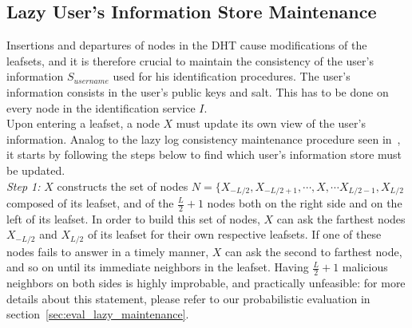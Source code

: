 
\subsection{Lazy User's Information Store Maintenance}
\label{sec:lazy_node_maintenance}
Insertions and departures of nodes in the DHT cause modifications of the
leafsets, and it is therefore crucial to maintain the consistency of the user's
information $S_{username}$ used for his identification procedures. The user's information
consists in the user's public keys and salt. This has to be done on every node in the identification service
$I$.\\

Upon entering a leafset, a node $X$ must update its own view of the user's
information. Analog to the lazy log consistency maintenance procedure seen
in~\cite{p2p_certification}, it starts by following the steps below to find
which user's information store must be updated.\\

\textit{Step 1:} $X$ constructs the set of nodes
$N = \{ X_{-L/2}, X_{-L/2 +1}, \cdots, X, \cdots X_{L/2 -1}, X_{L/2} $
composed of its leafset, and of the $\frac{L}{2} +1$ nodes both on the right
side and on the left of its leafset. 
In order to build this set of nodes, $X$ can ask the farthest nodes $X_{-L/2}$
and $X_{L/2}$ of its leafset for their own respective leafsets. If one of these
nodes fails to answer in a timely manner, $X$ can ask the second to farthest
node, and so on until its immediate neighbors in the leafset. Having
$\frac{L}{2} +1$ malicious neighbors on both sides is highly improbable, and
practically unfeasible: for more details about this statement, please refer to
our probabilistic evaluation in section~\eqref{sec:eval_lazy_maintenance}. \\

